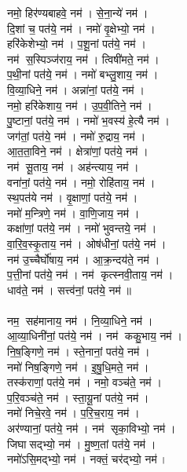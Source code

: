 नमो॒ हिर॑ण्यबाहवे॒ नम॑। से॒ना॒न्ये॑  नम॑। \\
दि॒शां च॒ पत॑ये॒ नम॑। नमो॑ वृ॒क्षेभ्यो॒ नम॑। \\
हरि॑केशेभ्यो॒  नम॑। प॒शू॒नां पत॑ये॒  नम॑। \\
नम॑ स॒स्पिञ्ज॑राय॒ नम॑। त्विषी॑मते॒ नम॑। \\
प॒थी॒नां पत॑ये॒ नम॑। नमो॑ बभ्लु॒शाय॒ नम॑। \\
वि॒व्या॒धिने॒ नम॑। अन्ना॑नां॒ पत॑ये॒ नम॑।  \\
नमो॒ हरि॑केशाय॒ नम॑। उ॒प॒वी॒तिने॒ नम॑। \\
पु॒ष्टानां॒ पत॑ये॒ नम॑। नमो॑ भ॒वस्य॑ हे॒त्यै नम॑। \\
जग॑तां॒ पत॑ये॒ नम॑। नमो॑ रु॒द्राय॒ नम॑। \\
आ॒त॒ता॒विने॒ नम॑। क्षेत्रा॑णां॒ पत॑ये॒ नम॑।  \\
नम॑ सू॒ताय॒ नम॑। अह॑न्त्याय॒ नम॑। \\
वना॑नां॒  पत॑ये॒ नम॑। नमो॒ रोहि॑ताय॒ नम॑। \\
स्थ॒पत॑ये नम॑। वृ॒क्षाणां॒ पत॑ये॒ नम॑। \\
नमो॑ म॒न्त्रिणे॒ नम॑। वा॒णि॒जाय॒ नम॑। \\
कक्षा॑णां॒ पत॑ये॒ नम॑। नमो॑ भुवन्तये॒ नम॑। \\
वा॒रि॒व॒स्कृ॒ताय॒ नम॑। ओष॑धीनां॒ पत॑ये॒ नम॑। \\
नम॑ उ॒च्चैर्घो॑षाय॒ नम॑। आ॒क्र॒न्दय॑ते॒ नम॑। \\
प॒त्ती॒नां पत॑ये॒ नम॑। नम॑ कृत्स्नवी॒ताय॒ नम॑। \\
धाव॑ते॒ नम॑। सत्त्व॑नां॒ पत॑ये॒ नम॑॥\\
\\
नम॒ सह॑मानाय॒ नम॑। नि॒व्या॒धिने॒ नम॑। \\
आ॒व्या॒धिनी॑नां॒ पत॑ये॒ नम॑। नम॑ ककु॒भाय॒ नम॑। \\
नि॒ष॒ङ्गिणे॒ नम॑। स्ते॒नानां॒ पत॑ये॒ नम॑। \\
नमो॑ निष॒ङ्गिणे॒ नम॑। इ॒षु॒धि॒मते॒ नम॑। \\
तस्क॑राणां॒ पत॑ये॒ नम॑। नमो॒ वञ्च॑ते॒ नम॑। \\
प॒रि॒वञ्च॑ते॒ नम॑। स्ता॒यू॒नां पत॑ये॒ नम॑। \\
नमो॑ निचे॒रवे॒ नम॑। प॒रि॒च॒राय॒ नम॑। \\
अर॑ण्यानां॒ पत॑ये॒ नम॑। नम॑ सृका॒विभ्यो॒ नम॑। \\
जिघासद्भ्यो॒ नम॑। मु॒ष्ण॒तां पत॑ये॒ नम॑। \\
नमो॑ऽसि॒मद्भ्यो॒ नम॑। नक्तं॒ चर॑द्भ्यो॒ नम॑। \\
